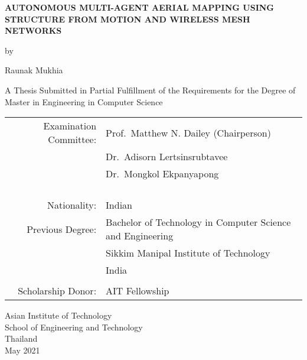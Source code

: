 \begin{titlepage}
  \begin{center}
   
  \textbf{\large{
  AUTONOMOUS MULTI-AGENT AERIAL MAPPING USING STRUCTURE FROM MOTION AND WIRELESS MESH NETWORKS
  }}

  \vspace{3em} %
  
  by
  
  \vspace{3em} %
  
  Raunak Mukhia
  
  \vspace{4em} %

  A Thesis Submitted in Partial Fulfillment of the Requirements for the Degree of Master in Engineering in Computer Science

  \vspace{4em} %

\begin{center}
  \begin{tabular}{ rl }
Examination Committee: & Prof.\ Matthew N. Dailey (Chairperson) \\
                       & Dr.\ Adisorn Lertsinsrubtavee \\ 
                       & Dr.\ Mongkol Ekpanyapong \\\\
                       
\\ \\ \\
Nationality:     & Indian \\
Previous Degree: & Bachelor of Technology in Computer Science and Engineering \\
                 & Sikkim Manipal Institute of Technology \\
                 & India \\
\\
Scholarship Donor: & AIT Fellowship
  \end{tabular}
\end{center}

\vspace{4em}

Asian Institute of Technology \\
School of Engineering and Technology \\
Thailand \\ 
May 2021


  \end{center}
\end{titlepage}
